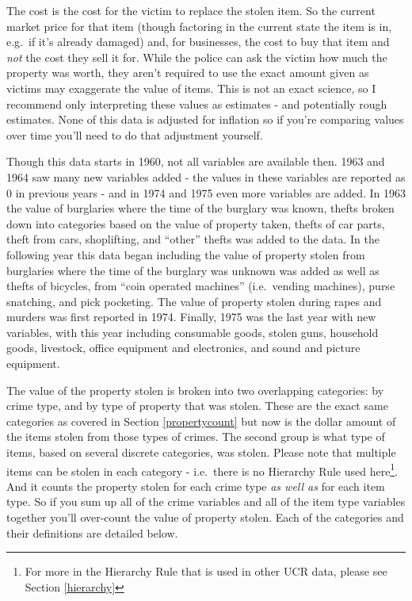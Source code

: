 \documentclass[
  12pt,
  openany]{book}
\begin{document}
The cost is the cost for the victim to replace the stolen item. So the current market price for that item (though factoring in the current state the item is in, e.g.~if it's already damaged) and, for businesses, the cost to buy that item and \emph{not} the cost they sell it for. While the police can ask the victim how much the property was worth, they aren't required to use the exact amount given as victims may exaggerate the value of items. This is not an exact science, so I recommend only interpreting these values as estimates - and potentially rough estimates. None of this data is adjusted for inflation so if you're comparing values over time you'll need to do that adjustment yourself.

Though this data starts in 1960, not all variables are available then. 1963 and 1964 saw many new variables added - the values in these variables are reported as 0 in previous years - and in 1974 and 1975 even more variables are added. In 1963 the value of burglaries where the time of the burglary was known, thefts broken down into categories based on the value of property taken, thefts of car parts, theft from cars, shoplifting, and ``other'' thefts was added to the data. In the following year this data began including the value of property stolen from burglaries where the time of the burglary was unknown was added as well as thefts of bicycles, from ``coin operated machines'' (i.e.~vending machines), purse snatching, and pick pocketing. The value of property stolen during rapes and murders was first reported in 1974. Finally, 1975 was the last year with new variables, with this year including consumable goods, stolen guns, household goods, livestock, office equipment and electronics, and sound and picture equipment.

The value of the property stolen is broken into two overlapping categories: by crime type, and by type of property that was stolen. These are the exact same categories as covered in Section \ref{propertycount} but now is the dollar amount of the items stolen from those types of crimes. The second group is what type of items, based on several discrete categories, was stolen. Please note that multiple items can be stolen in each category - i.e.~there is no Hierarchy Rule used here\footnote{For more in the Hierarchy Rule that is used in other UCR data, please see Section \ref{hierarchy}}. And it counts the property stolen for each crime type \emph{as well as} for each item type. So if you sum up all of the crime variables and all of the item type variables together you'll over-count the value of property stolen. Each of the categories and their definitions are detailed below.
\end{document}
